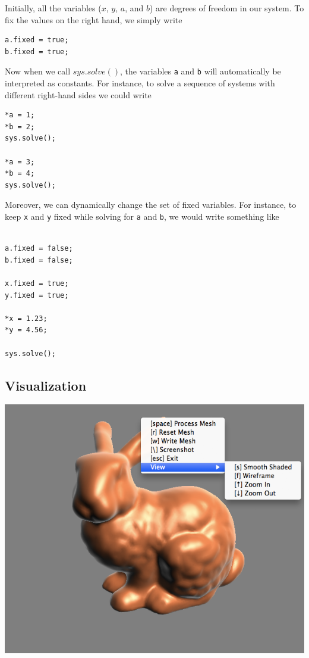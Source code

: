 \documentclass{article}
\begin{document}
Initially, all the variables (\(x\), \(y\), \(a\), and \(b\)) are degrees of freedom in our system.  To fix the values on the right hand, we simply write

\begin{verbatim}
a.fixed = true;
b.fixed = true;
\end{verbatim}

Now when we call \(sys.solve()\), the variables \texttt{a} and \texttt{b} will automatically be interpreted as constants.  For instance, to solve a sequence of systems with different right-hand sides we could write

\begin{verbatim}
*a = 1;
*b = 2;
sys.solve();

*a = 3;
*b = 4;
sys.solve();
\end{verbatim}

Moreover, we can dynamically change the set of fixed variables.  For instance, to keep \texttt{x} and \texttt{y} fixed while solving for \texttt{a} and \texttt{b}, we would write something like

\pagebreak

\begin{verbatim}

a.fixed = false;
b.fixed = false;

x.fixed = true;
y.fixed = true;

*x = 1.23;
*y = 4.56;

sys.solve();
\end{verbatim}

\pagebreak
\subsection{Visualization}

\begin{center}
\includegraphics[width=.7\columnwidth]{illustrations/viewer.png}
\end{center}
\end{document}
